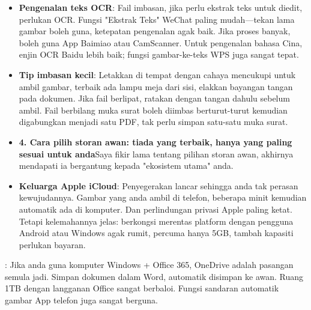 \begin{itemize}
  \item \textbf{Pengenalan teks OCR}: Fail imbasan, jika perlu ekstrak teks untuk diedit, perlukan OCR. Fungsi "Ekstrak Teks" WeChat paling mudah—tekan lama gambar boleh guna, ketepatan pengenalan agak baik. Jika proses banyak, boleh guna App Baimiao atau CamScanner. Untuk pengenalan bahasa Cina, enjin OCR Baidu lebih baik; fungsi gambar-ke-teks WPS juga sangat tepat.
  \item \textbf{Tip imbasan kecil}: Letakkan di tempat dengan cahaya mencukupi untuk ambil gambar, terbaik ada lampu meja dari sisi, elakkan bayangan tangan pada dokumen. Jika fail berlipat, ratakan dengan tangan dahulu sebelum ambil. Fail berbilang muka surat boleh diimbas berturut-turut kemudian digabungkan menjadi satu PDF, tak perlu simpan satu-satu muka surat.
  \item \textbf{4. Cara pilih storan awan: tiada yang terbaik, hanya yang paling sesuai untuk anda}Saya fikir lama tentang pilihan storan awan, akhirnya mendapati ia bergantung kepada "ekosistem utama" anda.
  \item \textbf{Keluarga Apple iCloud}: Penyegerakan lancar sehingga anda tak perasan kewujudannya. Gambar yang anda ambil di telefon, beberapa minit kemudian automatik ada di komputer. Dan perlindungan privasi Apple paling ketat. Tetapi kelemahannya jelas: berkongsi merentas platform dengan pengguna Android atau Windows agak rumit, percuma hanya 5GB, tambah kapasiti perlukan bayaran.
\end{itemize}


: Jika anda guna komputer Windows + Office 365, OneDrive adalah pasangan semula jadi. Simpan dokumen dalam Word, automatik disimpan ke awan. Ruang 1TB dengan langganan Office sangat berbaloi. Fungsi sandaran automatik gambar App telefon juga sangat berguna.

